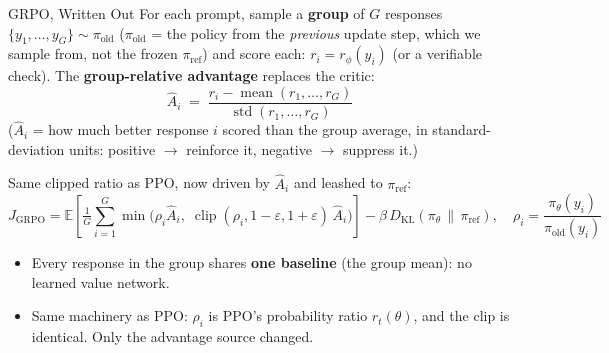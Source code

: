 \begin{frame}[allowframebreaks]{GRPO, Written Out}
For each prompt, sample a \textbf{group} of $G$ responses
$\{y_1, \dots, y_G\}\sim\pi_{\text{old}}$ ($\pi_{\text{old}}$ = the policy from the
\emph{previous} update step, which we sample from, not the frozen
$\pi_{\text{ref}}$) and score each: $r_i = r_\phi(y_i)$ (or a verifiable check). The
\textbf{group-relative advantage} replaces the critic:
\[
    \hat{A}_i \;=\; \frac{r_i - \operatorname{mean}(r_1, \dots, r_G)}
                          {\operatorname{std}(r_1, \dots, r_G)}
\]
($\hat{A}_i$ = how much better response $i$ scored than the group average, in
standard-deviation units: positive $\to$ reinforce it, negative $\to$ suppress it.)
\vspace{0.2em}

\framebreak

Same clipped ratio as PPO, now driven by $\hat{A}_i$ and leashed to
$\pi_{\text{ref}}$:
\[
    J_{\mathrm{GRPO}} =
    \mathbb{E}\!\left[ \tfrac{1}{G}\sum_{i=1}^{G}
        \min\!\big(\rho_i \hat{A}_i, \;
        \operatorname{clip}(\rho_i, 1{-}\varepsilon, 1{+}\varepsilon)\, \hat{A}_i\big)
    \right]
    - \beta\, D_{\mathrm{KL}}\!\left(\pi_\theta \, \|\, \pi_{\text{ref}}\right),
    \quad \rho_i = \frac{\pi_\theta(y_i)}{\pi_{\text{old}}(y_i)}
\]
\begin{itemize}\itemsep0.15em\small
    \item Every response in the group shares \textbf{one baseline} (the group mean):
          no learned value network.
    \item Same machinery as PPO: $\rho_i$ is PPO's probability ratio
          $r_t(\theta)$, and the clip is identical. Only the advantage source changed.
\end{itemize}
\end{frame}

